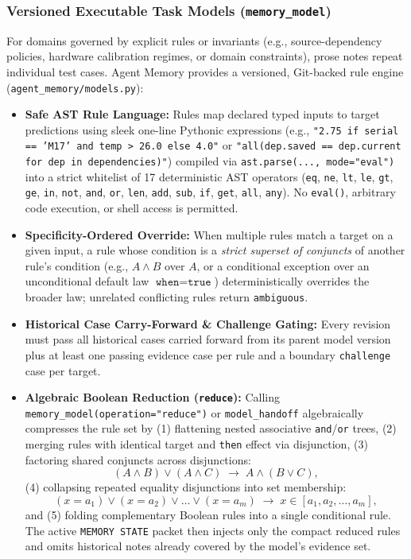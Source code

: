 \documentclass[11pt,a4paper]{article}
\begin{document}
\subsubsection{Versioned Executable Task Models (\texttt{memory\_model})}
For domains governed by explicit rules or invariants (e.g., source-dependency policies, hardware calibration regimes, or domain constraints), prose notes repeat individual test cases. Agent Memory provides a versioned, Git-backed rule engine (\texttt{agent\_memory/models.py}):
\begin{itemize}[leftmargin=1.5em]
    \item \textbf{Safe AST Rule Language:} Rules map declared typed inputs to target predictions using sleek one-line Pythonic expressions (e.g., \texttt{"2.75 if serial == 'M17' and temp > 26.0 else 4.0"} or \texttt{"all(dep.saved == dep.current for dep in dependencies)"}) compiled via \texttt{ast.parse(..., mode="eval")} into a strict whitelist of 17 deterministic AST operators (\texttt{eq}, \texttt{ne}, \texttt{lt}, \texttt{le}, \texttt{gt}, \texttt{ge}, \texttt{in}, \texttt{not}, \texttt{and}, \texttt{or}, \texttt{len}, \texttt{add}, \texttt{sub}, \texttt{if}, \texttt{get}, \texttt{all}, \texttt{any}). No \texttt{eval()}, arbitrary code execution, or shell access is permitted.
    \item \textbf{Specificity-Ordered Override:} When multiple rules match a target on a given input, a rule whose condition is a \emph{strict superset of conjuncts} of another rule's condition (e.g., $A \wedge B$ over $A$, or a conditional exception over an unconditional default law $\texttt{when}=\texttt{true}$) deterministically overrides the broader law; unrelated conflicting rules return \texttt{ambiguous}.
    \item \textbf{Historical Case Carry-Forward \& Challenge Gating:} Every revision must pass all historical cases carried forward from its parent model version plus at least one passing evidence case per rule and a boundary \texttt{challenge} case per target.
    \item \textbf{Algebraic Boolean Reduction (\texttt{reduce}):} Calling \texttt{memory\_model(operation="reduce")} or \texttt{model\_handoff} algebraically compresses the rule set by (1) flattening nested associative \texttt{and}/\texttt{or} trees, (2) merging rules with identical target and \texttt{then} effect via disjunction, (3) factoring shared conjuncts across disjunctions:
    \begin{equation}
        (A \wedge B) \vee (A \wedge C) \;\longrightarrow\; A \wedge (B \vee C),
    \end{equation}
    (4) collapsing repeated equality disjunctions into set membership:
    \begin{equation}
        (x = a_1) \vee (x = a_2) \vee \dots \vee (x = a_m) \;\longrightarrow\; x \in [a_1, a_2, \dots, a_m],
    \end{equation}
    and (5) folding complementary Boolean rules into a single conditional rule. The active \texttt{MEMORY STATE} packet then injects only the compact reduced rules and omits historical notes already covered by the model's evidence set.
\end{itemize}
\end{document}
